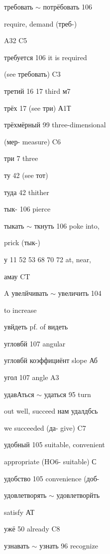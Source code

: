 \begin{minipage}[t]{0.475\textwidth}
\raggedright
\noindent требовать $\sim$ потрёбовать 106\par
\noindent require, demand (треб-)\par
\noindent A32 C5\par
\noindent требуется 106 it is required\par
\noindent (see требовать) C3\par
\noindent третий 16 17 third м7\par
\noindent трёх 17 (see три) А1Т\par
\noindent трёхмёрный 99 three-dimensional\par
\noindent (мер- measure) C6\par
\noindent три 7 three\par
\noindent ту 42 (see тот)\par
\noindent туда 42 thither\par
\noindent тык- 106 pierce\par
\noindent тыкать $\sim$ ткнуть 106 poke into,\par
\noindent prick (тык-)\par
\noindent у 11 52 53 68 70 72 at, near,\par
\noindent амау CT\par
\noindent A увелйчивать $\sim$ увеличить 104\par
\noindent to increase\par
\noindent увйдеть pf. of видеть\par
\noindent угловбй 107 angular\par
\noindent угловбй коэффициёнт slope Аб\par
\noindent угол 107 angle A3\par
\noindent удавАться $\sim$ удаться 95 turn\par
\noindent out well, succeed нам удалдбсь\par
\noindent we succeeded (да- give) C7\par
\noindent удобный 105 suitable, convenient\par
\noindent appropriate (HO6- suitable) С\par
\noindent удобство 105 convenience (доб-\par
\noindent удовлетворять $\sim$ удовлетворйть\par
{} satisfy АТ\par
\noindent ужё 50 already C8\par
\noindent узнавать  $\sim$ узнать 96 recognize\par

\end{minipage}
